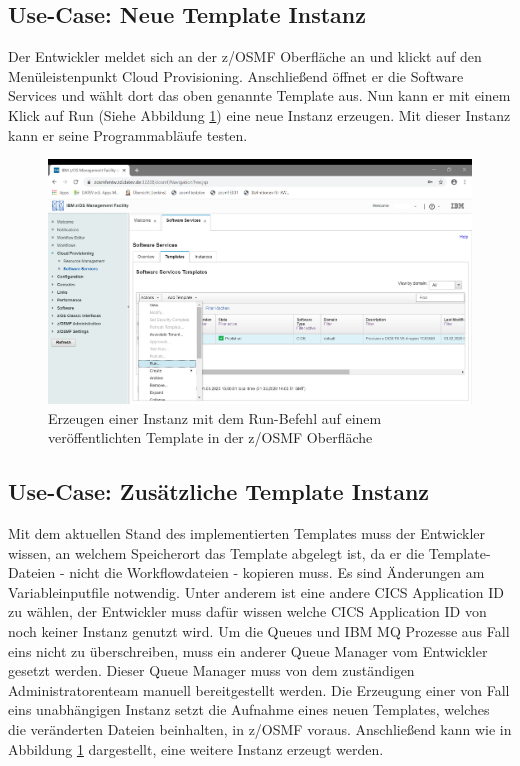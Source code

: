\subsection{Use-Case: Neue Template Instanz}
Der Entwickler meldet sich an der z/OSMF Oberfläche an und klickt auf den Menüleistenpunkt \glqq Cloud Provisioning\grqq.
Anschließend öffnet er die \glqq Software Services\grqq{} und wählt dort das oben genannte Template aus.
Nun kann er mit einem Klick auf \glqq Run\grqq{} (Siehe Abbildung \ref{fig:runtemp}) eine neue Instanz erzeugen.
Mit dieser Instanz kann er seine Programmabläufe testen.
\begin{figure}[h]
	\centering
	\includegraphics[width=\textwidth]{figures/published.png}
	\caption{Erzeugen einer Instanz mit dem \glqq Run\grqq-Befehl auf einem veröffentlichten Template in der z/OSMF Oberfläche}
	\label{fig:runtemp}
\end{figure}

\subsection{Use-Case: Zusätzliche Template Instanz}\label{ssec:akttemp2fall}
Mit dem aktuellen Stand des implementierten Templates muss der Entwickler wissen, an welchem Speicherort das Template abgelegt ist, da er die Template-Dateien - nicht die Workflowdateien - kopieren muss.
Es sind Änderungen am Variableinputfile notwendig.
Unter anderem ist eine andere CICS Application ID zu wählen, der Entwickler muss dafür wissen welche CICS Application ID von noch keiner Instanz genutzt wird.
Um die Queues und IBM MQ Prozesse aus Fall eins nicht zu überschreiben, muss  ein anderer Queue Manager vom Entwickler gesetzt werden.
Dieser Queue Manager muss von dem zuständigen Administratorenteam manuell bereitgestellt werden.
Die Erzeugung einer von Fall eins unabhängigen Instanz setzt die Aufnahme eines neuen Templates, welches die veränderten Dateien beinhalten, in z/OSMF voraus.
Anschließend kann wie in Abbildung \ref{fig:runtemp} dargestellt, eine weitere Instanz erzeugt werden.

